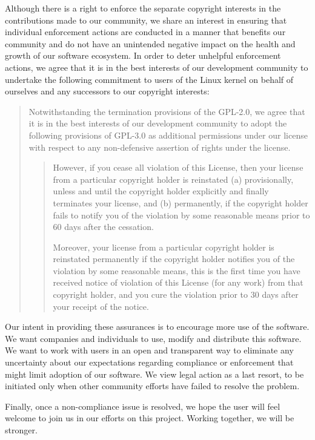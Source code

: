 \documentclass[a4paper,8pt,english]{sphinxmanual}
\begin{document}
Although there is a right to enforce the separate copyright interests in the
contributions made to our community, we share an interest in ensuring that
individual enforcement actions are conducted in a manner that benefits our
community and do not have an unintended negative impact on the health and
growth of our software ecosystem.  In order to deter unhelpful enforcement
actions, we agree that it is in the best interests of our development
community to undertake the following commitment to users of the Linux kernel
on behalf of ourselves and any successors to our copyright interests:
\begin{quote}

Notwithstanding the termination provisions of the GPL-2.0, we agree that
it is in the best interests of our development community to adopt the
following provisions of GPL-3.0 as additional permissions under our
license with respect to any non-defensive assertion of rights under the
license.
\begin{quote}

However, if you cease all violation of this License, then your license
from a particular copyright holder is reinstated (a) provisionally,
unless and until the copyright holder explicitly and finally
terminates your license, and (b) permanently, if the copyright holder
fails to notify you of the violation by some reasonable means prior to
60 days after the cessation.

Moreover, your license from a particular copyright holder is
reinstated permanently if the copyright holder notifies you of the
violation by some reasonable means, this is the first time you have
received notice of violation of this License (for any work) from that
copyright holder, and you cure the violation prior to 30 days after
your receipt of the notice.
\end{quote}
\end{quote}

Our intent in providing these assurances is to encourage more use of the
software.  We want companies and individuals to use, modify and distribute
this software.  We want to work with users in an open and transparent way to
eliminate any uncertainty about our expectations regarding compliance or
enforcement that might limit adoption of our software.  We view legal action
as a last resort, to be initiated only when other community efforts have
failed to resolve the problem.

Finally, once a non-compliance issue is resolved, we hope the user will feel
welcome to join us in our efforts on this project.  Working together, we will
be stronger.
\end{document}
